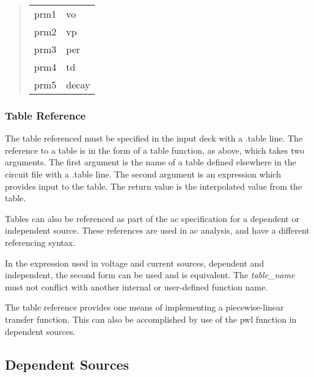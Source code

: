 \begin{quote}
\begin{tabular}{ll}
prm1 & vo\\
prm2 & vp\\
prm3 & per\\
prm4 & td\\
prm5 & decay\\
\end{tabular}
\end{quote}

\subsubsection{Table Reference}



The table referenced must be specified in the input deck with a {\vt
.table} line.  The reference to a table is in the form of a {\vt
table} function, as above, which takes two arguments.  The first
argument is the name of a table defined elsewhere in the circuit file
with a {\vt .table} line.  The second argument is an expression which
provides input to the table.  The return value is the interpolated
value from the table.

Tables can also be referenced as part of the ac specification for a
dependent or independent source.  These references are used in ac
analysis, and have a different referencing syntax.

In the expression used in voltage and current sources, dependent and
independent, the second form can be used and is equivalent.  The {\it
table\_name} must not conflict with another internal or user-defined
function name.

The {\vt table} reference provides one means of implementing a
piecewise-linear transfer function.  This can also be accomplished by
use of the {\vt pwl} function in dependent sources.

\subsection{Dependent Sources}
\label{depsrc}

